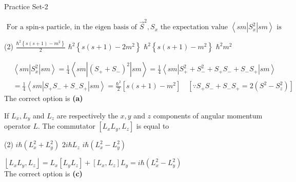 \newpage
\begin{abox}
	Practice Set-2 
	\end{abox}
\begin{enumerate}
\begin{minipage}{\textwidth}
	\item $\text { For a spin-s particle, in the eigen basis of } \vec{S}^{2}, S_{x} \text { the expectation value }\left\langle s m\left|S_{x}^{2}\right| s m\right\rangle \text { is }$
\end{minipage}
\begin{tasks}(2)
	\task[\textbf{A.}] $\frac{\hbar^{2}\left\{s(s+1)-m^{2}\right\}}{2}$
	\task[\textbf{B.}] $\hbar^{2}\left\{s(s+1)-2 m^{2}\right\}$
	\task[\textbf{C.}]$\hbar^{2}\left\{s(s+1)-m^{2}\right\}$
	\task[\textbf{D.}]$\hbar^{2} m^{2}$
\end{tasks}
\begin{answer}
\begin{align*}
	&\left\langle s m\left|S_{x}^{2}\right| s m\right\rangle=\frac{1}{4}\left\langle s m\left|\left(S_{+}+S_{-}\right)^{2}\right| s m\right\rangle=\frac{1}{4}\left\langle s m\left|S_{+}^{2}+S_{-}^{2}+S_{+} S_{-}+S_{-} S_{+}\right| s m\right\rangle \\
	&=\frac{1}{4}\left\langle s m\left|S_{+} S_{-}+S_{-} S_{+}\right| s m\right\rangle=\frac{\hbar^{2}}{2}\left[s(s+1)-m^{2}\right] \quad\left[\because S_{+} S_{-}+S_{-} S_{+}=2\left(S^{2}-S_{z}^{2}\right)\right]
\end{align*}
The correct option is \textbf{(a)}	
\end{answer}
\begin{minipage}{\textwidth}
	\item If $L_{x}, L_{y}$ and $L_{z}$ are respectively the $x, y$ and $z$ components of angular momentum operator $L$. The commutator $\left[L_{x} L_{y}, L_{z}\right]$ is equal to
\end{minipage}
\begin{tasks}(2)
	\task[\textbf{A.}] $i \hbar\left(L_{x}^{2}+L_{y}^{2}\right)$
	\task[\textbf{B.}]$2 i \hbar L_{z}$
	\task[\textbf{C.}]$i \hbar\left(L_{x}^{2}-L_{y}^{2}\right)$
\end{tasks}
\begin{answer}
	$\left\lfloor L_{x} L_{y}, L_{z}\right\rfloor=L_{x}\left[L_{y} L_{z}\right]+\left[L_{x}, L_{z}\right] L_{y}=i \hbar\left(L_{x}^{2}-L_{y}^{2}\right)$\\
	The correct option is \textbf{(c)}
\end{answer}

\end{enumerate}
